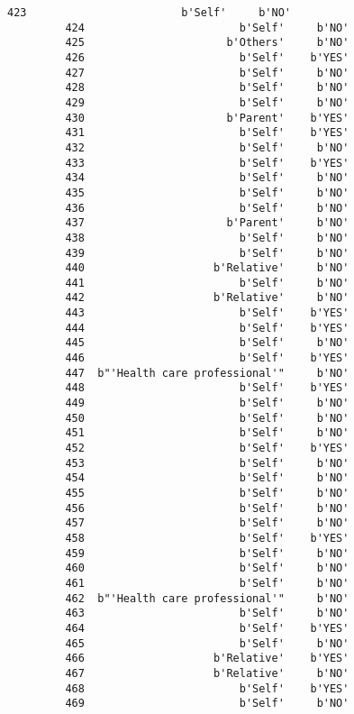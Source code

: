 \documentclass[11pt]{article}
\begin{document}
\begin{Verbatim}[commandchars=\\\{\}]
         423                        b'Self'     b'NO'  
         424                        b'Self'     b'NO'  
         425                      b'Others'     b'NO'  
         426                        b'Self'    b'YES'  
         427                        b'Self'     b'NO'  
         428                        b'Self'     b'NO'  
         429                        b'Self'     b'NO'  
         430                      b'Parent'    b'YES'  
         431                        b'Self'    b'YES'  
         432                        b'Self'     b'NO'  
         433                        b'Self'    b'YES'  
         434                        b'Self'     b'NO'  
         435                        b'Self'     b'NO'  
         436                        b'Self'     b'NO'  
         437                      b'Parent'     b'NO'  
         438                        b'Self'     b'NO'  
         439                        b'Self'     b'NO'  
         440                    b'Relative'     b'NO'  
         441                        b'Self'     b'NO'  
         442                    b'Relative'     b'NO'  
         443                        b'Self'    b'YES'  
         444                        b'Self'    b'YES'  
         445                        b'Self'     b'NO'  
         446                        b'Self'    b'YES'  
         447  b"'Health care professional'"     b'NO'  
         448                        b'Self'    b'YES'  
         449                        b'Self'     b'NO'  
         450                        b'Self'     b'NO'  
         451                        b'Self'     b'NO'  
         452                        b'Self'    b'YES'  
         453                        b'Self'     b'NO'  
         454                        b'Self'     b'NO'  
         455                        b'Self'     b'NO'  
         456                        b'Self'     b'NO'  
         457                        b'Self'     b'NO'  
         458                        b'Self'    b'YES'  
         459                        b'Self'     b'NO'  
         460                        b'Self'     b'NO'  
         461                        b'Self'     b'NO'  
         462  b"'Health care professional'"     b'NO'  
         463                        b'Self'     b'NO'  
         464                        b'Self'    b'YES'  
         465                        b'Self'     b'NO'  
         466                    b'Relative'    b'YES'  
         467                    b'Relative'     b'NO'  
         468                        b'Self'    b'YES'  
         469                        b'Self'     b'NO'  

\end{Verbatim}
\end{document}
